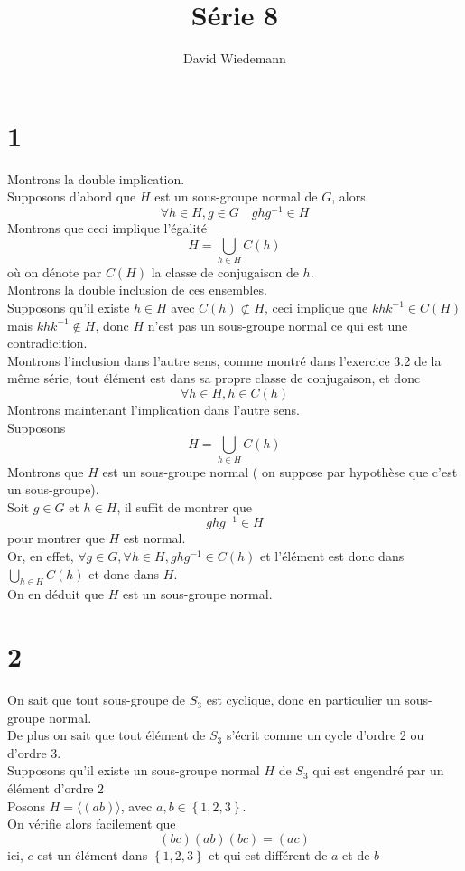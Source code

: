 \documentclass[11pt, a4paper, twoside]{article}
\begin{document}
\title{Série 8}
\author{David Wiedemann}
\maketitle
\section*{1}
Montrons la double implication.\\
Supposons d'abord que $H$ est un sous-groupe normal de $G$, alors
\[ 
\forall h \in H, g \in G\quad ghg^{-1} \in H
\]
Montrons que ceci implique l'égalité 
\[ 
	H = \bigcup_{h \in H} C( h) 
\]
où on dénote par $C( H) $ la classe de conjugaison de $h$.\\
Montrons la double inclusion de ces ensembles.\\

Supposons qu'il existe $h \in H$ avec  $C( h) \not\subset H $, ceci implique que $khk^{-1} \in C( H) $ mais $khk^{-1} \notin H$, donc $H$ n'est pas un sous-groupe normal ce qui est une contradicition.\\
Montrons l'inclusion dans l'autre sens, comme montré dans l'exercice 3.2 de la même série, tout élément est dans sa propre classe de conjugaison, et donc
 \[ 
\forall	 h \in H, h \in C( h) 
\]
Montrons maintenant l'implication dans l'autre sens.\\
Supposons 
\[ 
	H = \bigcup_{h \in H} C( h) 
\]
Montrons que $H$ est un sous-groupe normal ( on suppose par hypothèse que c'est un sous-groupe).\\
Soit $g \in G$ et $h \in H$, il suffit de montrer que 
\[ 
ghg^{-1}\in H
\]
pour montrer que $H$ est normal.\\
Or, en effet, $ \forall g \in G, \forall h \in H, ghg^{-1}\in C( h) $ et l'élément est donc dans $\bigcup_{h \in H} C( h) $ et donc dans $H$.\\
On en déduit que $H$ est un sous-groupe normal.
\section*{2}
On sait que tout sous-groupe de $S_3$ est cyclique, donc en particulier un sous-groupe normal.\\
De plus on sait que tout élément de $S_3$ s'écrit comme un cycle d'ordre 2 ou d'ordre 3.\\
Supposons qu'il existe un sous-groupe normal $H$ de $S_3$ qui est engendré par un élément d'ordre $2$ \\
Posons $H = \langle ( ab) \rangle$,  avec $a,b \in \left\{ 1,2,3 \right\} $.\\
On vérifie alors facilement que
\[ 
	( bc) ( ab) ( bc) = ( ac) 
\]
ici, $c$ est un élément dans $ \left\{ 1,2,3 \right\} $ et qui est différent de $a$ et de $b$ 
\end{document}
